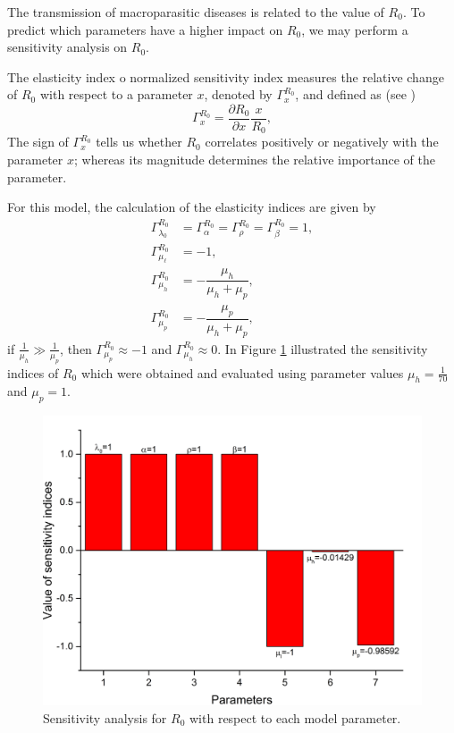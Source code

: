 \documentclass[eng]{MMSB-class-eng}
\begin{document}
	{\color{red}	
		The transmission of macroparasitic diseases is related to the value of $R_0$. To predict which parameters have a higher impact on $R_0$, we may perform a sensitivity analysis on $R_0$.	
	
	The elasticity index o normalized sensitivity index measures the relative change of $R_0$ with respect to a parameter $x$, denoted by $\Gamma^{R_0}_{x}$, and defined as (see \citet{van2017reproduction})
	\begin{equation}
	\Gamma^{R_0}_{x}=\dfrac{\partial R_0}{\partial x} \dfrac{x}{R_0},
	\end{equation}
	The sign of $\Gamma^{R_0}_{x}$ tells us whether $R_0$ correlates positively or negatively  with the  parameter $x$; whereas its magnitude determines the relative importance of the parameter.
	
	For this model, the calculation of the elasticity indices are given by	
	\begin{equation}
	\begin{split}
	\Gamma^{R_0}_{\lambda_0}&=\Gamma^{R_0}_{\alpha}=\Gamma^{R_0}_{\rho}=\Gamma^{R_0}_{\beta}=1,\\ 
	\Gamma^{R_0}_{\mu_{\ell}}&=-1,\\
	\Gamma^{R_0}_{\mu_h}&=-\dfrac{\mu_h}{\mu_{h}+\mu_p},\\
	\Gamma^{R_0}_{\mu_p}&=-\dfrac{\mu_p}{\mu_{h}+\mu_p},
	\end{split}
	\end{equation}
	if $\frac{1}{\mu_h} \gg \frac{1}{\mu_p}$, then $\Gamma^{R_0}_{\mu_p}\approx -1$
	and 
	$\Gamma^{R_0}_{\mu_h}\approx 0$.
	In Figure \ref{fig:sensitivity} illustrated the sensitivity indices of $R_0$ which were obtained and evaluated using parameter values 
	$\mu_h=\frac{1}{70}$ and $\mu_p=1$.
	\begin{figure}[h!]
		\centering
		\includegraphics[width=0.9\linewidth]{sensitivity}
		\caption{Sensitivity analysis for $R_0$ with respect to each model parameter.}
		\label{fig:sensitivity}
	\end{figure}
	
}
\end{document}
